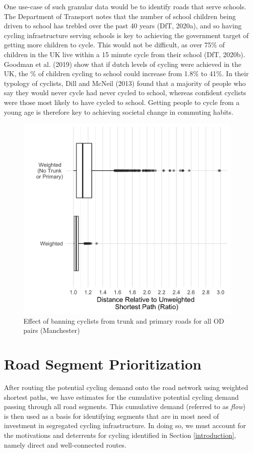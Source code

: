 \documentclass[
]{article}
\begin{document}
One use-case of such granular data would be to identify roads that serve
schools. The Department of Transport notes that the number of school
children being driven to school has trebled over the past 40 years
(DfT, 2020a), and so having cycling infrastructure
serving schools is key to achieving the government target of getting
more children to cycle. This would not be difficult, as over 75\% of
children in the UK live within a 15 minute cycle from their school
(DfT, 2020b). Goodman et al. (2019) show that if
dutch levels of cycling were achieved in the UK, the \% of children
cycling to school could increase from 1.8\% to 41\%. In their typology of
cyclists, Dill and McNeil (2013) found that a majority of people who say they
would never cycle had never cycled to school, whereas confident cyclists
were those most likely to have cycled to school. Getting people to cycle
from a young age is therefore key to achieving societal change in
commuting habits.

\begin{figure}

{\centering \includegraphics[width=0.5\linewidth]{data/Manchester/Plots/boxplot_weighted_unweighted_distances} 

}

\caption{Effect of banning cyclists from trunk and primary roads for all OD pairs (Manchester)}\label{fig:boxplotcircuity}
\end{figure}

\hypertarget{road-segment-prioritization}{%
\section{Road Segment Prioritization}\label{road-segment-prioritization}}

After routing the potential cycling demand onto the road network using
weighted shortest paths, we have estimates for the cumulative potential
cycling demand passing through all road segments. This cumulative demand
(referred to as \emph{flow}) is then used as a basis for identifying segments
that are in most need of investment in segregated cycling
infrastructure. In doing so, we must account for the motivations and
deterrents for cycling identified in Section \ref{introduction}, namely
direct and well-connected routes.
\end{document}
